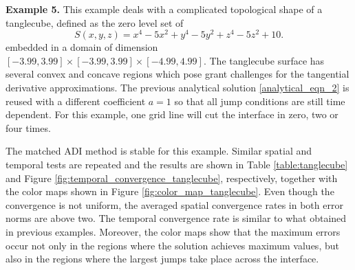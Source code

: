 \documentclass[dissertation]{uathesis}
\begin{document}
\begin{body}


{\flushleft \bf Example 5.} This example deals with a complicated topological shape of a tanglecube, defined as the zero level set of 
%
\begin{equation} \label{tanglecube}
S(x,y,z) = x^{4}-5x^{2}+y^{4}-5y^{2}+z^{4}-5z^{2}+10. 
\end{equation}
%
embedded in a domain of dimension $[-3.99,3.99]\times[-3.99,3.99]\times[-4.99,4.99]$. The tanglecube surface has several convex and concave regions which pose grant challenges for the tangential derivative approximations. The previous analytical solution \eqref{analytical_eqn_2} is reused with a different coefficient $a=1$ so that all jump conditions are still time dependent. For this example, one grid line will cut the interface in zero, two or four times. 

The matched ADI method is stable for this example. 
Similar spatial and temporal tests are repeated and the results are shown in Table \ref{table:tanglecube} and Figure \ref{fig:temporal_convergence_tanglecube}, respectively, together with the color maps shown in Figure \ref{fig:color_map_tanglecube}. 
Even though the convergence is not uniform, the averaged spatial convergence rates in both error norms are above two. The temporal convergence rate is similar to what obtained in previous examples. 
Moreover, the color maps show that the maximum errors occur not only in the regions where the solution achieves maximum values, but also in the regions where the largest jumps take place across the interface.


\end{body}
\end{document}
